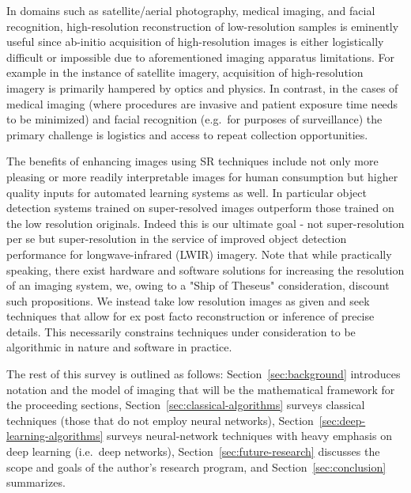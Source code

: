 In domains such as satellite/aerial photography, medical imaging, and facial recognition,
high-resolution reconstruction of low-resolution samples is eminently useful since ab-initio acquisition of high-resolution images is either logistically difficult or impossible due to aforementioned imaging apparatus limitations.
%
For example in the instance of satellite imagery, acquisition of high-resolution imagery is primarily hampered by optics and physics.
%
In contrast, in the cases of medical imaging (where procedures are invasive and patient exposure time needs to be minimized\cite{doi:10.1002.cmr.a.21249}) and facial recognition (e.g.\ for purposes of surveillance) the primary challenge is logistics and access to repeat collection opportunities.


The benefits of enhancing images using SR techniques include not only more pleasing or more readily interpretable images for human consumption but higher quality inputs for automated learning systems as well.
%
In particular object detection systems trained on super-resolved images outperform those trained on the low
resolution originals\cite{effectssuperres}.
%
Indeed this is our ultimate goal - not super-resolution per se but super-resolution in the service of improved object detection performance for longwave-infrared (LWIR) imagery.
%
Note that while practically speaking, there exist hardware and software solutions for increasing the resolution of an imaging
system, we, owing to a "Ship of Theseus" consideration, discount such propositions.
%
We instead take low resolution images as given and seek techniques that allow for ex post facto reconstruction or inference of precise details.
%
This necessarily constrains techniques under consideration to be algorithmic in nature and software in practice.

The rest of this survey is outlined as follows: Section~\ref{sec:background} introduces notation and the model of imaging that will be the mathematical framework for the proceeding sections, Section~\ref{sec:classical-algorithms} surveys classical techniques (those that do not employ neural networks), Section~\ref{sec:deep-learning-algorithms} surveys neural-network techniques with heavy emphasis on deep learning (i.e.\ deep networks), Section~\ref{sec:future-research} discusses the scope and goals of the author's research program, and Section~\ref{sec:conclusion} summarizes.
